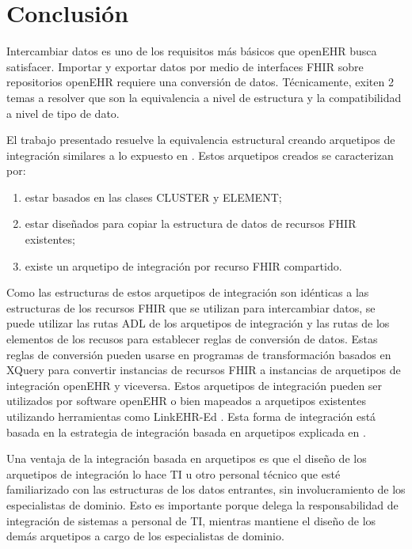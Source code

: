 \section{Conclusión}

Intercambiar datos es uno de los requisitos más básicos que openEHR busca satisfacer. Importar y exportar datos por medio de interfaces FHIR sobre repositorios openEHR requiere una conversión de datos. Técnicamente, exiten 2 temas a resolver que son la equivalencia a nivel de estructura y la compatibilidad a nivel de tipo de dato.

El trabajo presentado resuelve la equivalencia estructural creando arquetipos de integración similares a lo expuesto en \cite{openEHRArchitecture}. Estos arquetipos creados se caracterizan por:

\begin{enumerate}
  \item estar basados en las clases CLUSTER y ELEMENT;
  \item estar diseñados para copiar la estructura de datos de recursos FHIR existentes;
  \item existe un arquetipo de integración por recurso FHIR compartido.
\end{enumerate}

Como las estructuras de estos arquetipos de integración son idénticas a las estructuras de los recursos FHIR que se utilizan para intercambiar datos, se puede utilizar las rutas ADL de los arquetipos de integración y las rutas de los elementos de los recusos para establecer reglas de conversión de datos. Estas reglas de conversión pueden usarse en programas de transformación basados en XQuery para convertir instancias de recursos FHIR a instancias de arquetipos de integración openEHR y viceversa. Estos arquetipos de integración pueden ser utilizados por software openEHR o bien mapeados a arquetipos existentes utilizando herramientas como LinkEHR-Ed \cite{Maldonado09}. Esta forma de integración está basada en la estrategia de integración basada en arquetipos explicada en \cite{openEHRIntegration}.

Una ventaja de la integración basada en arquetipos es que el diseño de los arquetipos de integración lo hace TI u otro personal técnico que esté familiarizado con las estructuras de los datos entrantes, sin involucramiento de los especialistas de dominio. Esto es importante porque delega la responsabilidad de integración de sistemas a personal de TI, mientras mantiene el diseño de los demás arquetipos a cargo de los especialistas de dominio.

